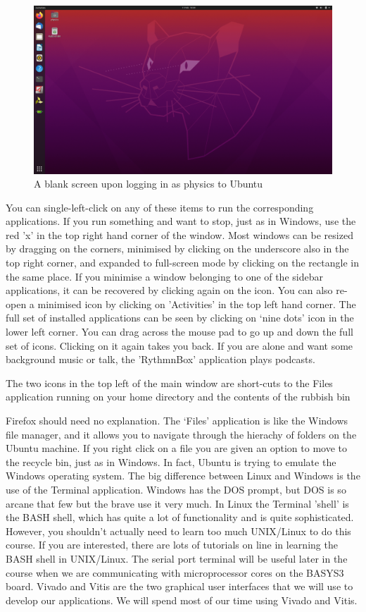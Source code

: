 \documentclass[../physical_computing.tex]{subfiles}
\begin{document}
\begin{figure}
    \centering
    \includegraphics[width=\textwidth]{figures/blank_ubuntu_screen.png}
    \caption{A blank screen upon logging in as physics to Ubuntu}
    \label{fig:emptyscreen}
\end{figure}

You can single-left-click on any of these items to run the corresponding applications. If you run something and want to stop, just as in Windows, use the red 'x' in the top right hand corner of the window. Most windows can be resized by dragging on the corners, minimised by clicking on the underscore also in the top right corner, and expanded to full-screen mode by clicking on the rectangle in the same place. If you minimise a window belonging to one of the sidebar applications, it can be recovered by clicking again on the icon. You can also re-open a minimised icon by clicking on 'Activities' in the top left hand corner. The full set of installed applications can be seen by clicking on `nine dots' icon in the lower left corner. You can drag across the mouse pad to go up and down the full set of icons. Clicking on it again takes you back. If you are alone and want some background music or talk, the 'RythmnBox' application plays podcasts. 

The two icons in the top left of the main window are short-cuts to the Files application running on your home directory and the contents of the rubbish bin

Firefox should need no explanation. The `Files' application is like the Windows file manager, and it allows you to navigate through the hierachy of folders on the Ubuntu machine. If you right click on a file you are given an option to move to the recycle bin, just as in Windows. In fact, Ubuntu is trying to emulate the Windows operating system. The big difference between Linux and Windows is the use of the Terminal application. Windows has the DOS prompt, but DOS is so arcane that few but the brave use it very much. In Linux the Terminal 'shell' is the BASH shell, which has quite a lot of functionality and is quite sophisticated. However, you shouldn't actually need to learn too much UNIX/Linux to do this course. If you are interested, there are lots of tutorials on line in learning the BASH shell in UNIX/Linux. The serial port terminal will be useful later in the course when we are communicating with microprocessor cores on the BASYS3 board. Vivado and Vitis are the two graphical user interfaces that we will use to develop our applications. We will spend most of our time using Vivado and Vitis.
\end{document}
